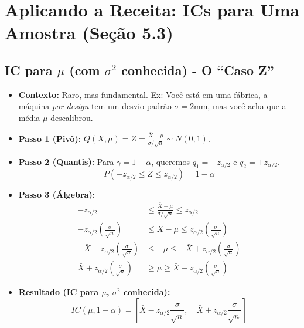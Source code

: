 \documentclass[12pt, a4paper]{article}
\theoremstyle{definition} %
\theoremstyle{remark} %
\begin{document}
\newpage
\section{Aplicando a Receita: ICs para Uma Amostra (Seção 5.3)}

\subsection{\texorpdfstring{IC para $\mu$ (com $\sigma^2$ conhecida) - O ``Caso Z''}{IC para mu (com sigma^2 conhecida) - O ``Caso Z''}}
\begin{itemize}
    \item \textbf{Contexto:} Raro, mas fundamental. Ex: Você está em uma fábrica, a máquina \textit{por design} tem um desvio padrão $\sigma=2$mm, mas você acha que a média $\mu$ descalibrou.
    \item \textbf{Passo 1 (Pivô):} $Q(X, \mu) = Z = \frac{\bar{X} - \mu}{\sigma / \sqrt{n}} \sim N(0,1)$.
    \item \textbf{Passo 2 (Quantis):} Para $\gamma = 1-\alpha$, queremos $q_1 = -z_{\alpha/2}$ e $q_2 = +z_{\alpha/2}$.
        $$ P(-z_{\alpha/2} \le Z \le z_{\alpha/2}) = 1-\alpha $$
    \item \textbf{Passo 3 (Álgebra):}
    \begin{align*}
        -z_{\alpha/2} &\le \frac{\bar{X} - \mu}{\sigma / \sqrt{n}} \le z_{\alpha/2} \\
        -z_{\alpha/2} \left(\frac{\sigma}{\sqrt{n}}\right) &\le \bar{X} - \mu \le z_{\alpha/2} \left(\frac{\sigma}{\sqrt{n}}\right) \\
        -\bar{X} - z_{\alpha/2} \left(\frac{\sigma}{\sqrt{n}}\right) &\le - \mu \le -\bar{X} + z_{\alpha/2} \left(\frac{\sigma}{\sqrt{n}}\right) \\
        \bar{X} + z_{\alpha/2} \left(\frac{\sigma}{\sqrt{n}}\right) &\ge \mu \ge \bar{X} - z_{\alpha/2} \left(\frac{\sigma}{\sqrt{n}}\right)
    \end{align*}
    \item \textbf{Resultado (IC para $\mu$, $\sigma^2$ conhecida):}
        $$ IC(\mu, 1-\alpha) = \left[ \bar{X} - z_{\alpha/2} \frac{\sigma}{\sqrt{n}}, \quad \bar{X} + z_{\alpha/2} \frac{\sigma}{\sqrt{n}} \right] $$
\end{itemize}
\end{document}
